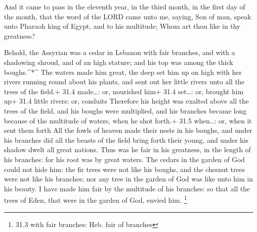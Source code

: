  And it came to pass in the eleventh year, in the third
month, in the first day of the month, that the word of the LORD came
unto me, saying,  Son of man, speak unto Pharaoh king of
Egypt, and to his multitude; Whom art thou like in thy greatness?

 Behold, the Assyrian was a cedar in Lebanon with fair
branches, and with a shadowing shroud, and of an high stature; and his
top was among the thick boughs.\^{}*\^{}  The waters made
him great, the deep set him up on high with her rivers running round
about his plants, and sent out her little rivers unto all the trees of
the field.+ 31.4 made\ldots: or, nourished him+ 31.4 set\ldots: or,
brought him up+ 31.4 little rivers: or, conduits  Therefore
his height was exalted above all the trees of the field, and his boughs
were multiplied, and his branches became long because of the multitude
of waters, when he shot forth.+ 31.5 when\ldots: or, when it sent them
forth  All the fowls of heaven made their nests in his
boughs, and under his branches did all the beasts of the field bring
forth their young, and under his shadow dwelt all great nations.
 Thus was he fair in his greatness, in the length of his
branches: for his root was by great waters.  The cedars in
the garden of God could not hide him: the fir trees were not like his
boughs, and the chesnut trees were not like his branches; nor any tree
in the garden of God was like unto him in his beauty.  I
have made him fair by the multitude of his branches: so that all the
trees of Eden, that were in the garden of God, envied him. \footnote{31.3
  with fair branches: Heb. fair of branches}

